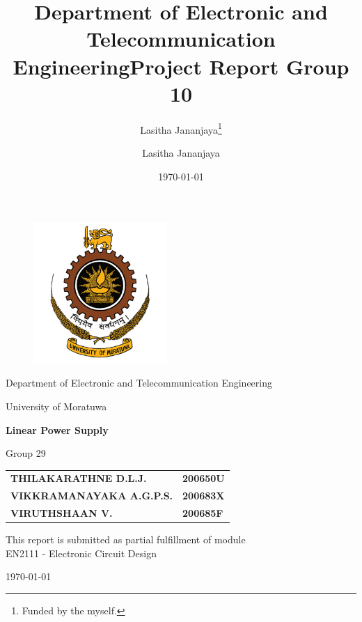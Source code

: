 \documentclass[12pt, a4paper]{article}
\title{Department of Electronic and Telecommunication Engineering}
\author{Lasitha Jananjaya\thanks{Funded by the myself.}}
\date{\today}
\title{Project Report Group 10}
\author{Lasitha Jananjaya}
\begin{document}
\begin{titlepage}
   \begin{center}
       \vspace*{0.3cm}

       \begin{figure}[h]
       \centering
       \includegraphics[width=0.45\textwidth]{University_of_Moratuwa_logo}
       \label{fig:university_logo}
       \end{figure}

       \vspace*{0.2cm}

       Department of Electronic and Telecommunication Engineering

       University of Moratuwa
       \vspace{1.5cm}

       {\Large\textbf{Linear Power Supply}\par}

       \vspace{0.5cm}
       {\large{Group 29}\par}
            
       \vspace{1.5cm}

       \begin{tabular}{p{19em} l}
           \textbf{THILAKARATHNE D.L.J.} & \textbf{200650U} \\ 
           \textbf{VIKKRAMANAYAKA A.G.P.S.} & \textbf{200683X} \\  
           \textbf{VIRUTHSHAAN V.} & \textbf{200685F} \\
       \end{tabular}

       \vspace{4.5cm}
            
       This report is submitted as partial fulfillment of module
       \\EN2111 - Electronic Circuit Design
            
       \vspace{0.8cm}
       
       \today
            
   \end{center}
\end{titlepage}
\end{document}
